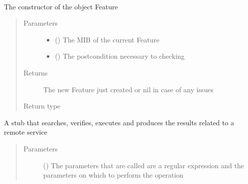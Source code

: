 \documentclass[a4paper,10pt,english,openany,oneside]{sphinxmanual}
\begin{document}
\begin{fulllineitems}
\label{\detokenize{code:Feature}}~

\begin{fulllineitems}
\label{\detokenize{code:Feature.new}}
The constructor of the object Feature
\begin{quote}\begin{description}
\item[{Parameters}] \leavevmode\begin{itemize}
\item {} 
 () \textendash{} The MIB of the current Feature

\item {} 
 () \textendash{} The post\sphinxhyphen{}condition necessary to checking

\end{itemize}

\item[{Returns}] \leavevmode
The new Feature just created or nil in case of any issues

\item[{Return type}] \leavevmode
{\hyperref[\detokenize{code:Feature}]{}}

\end{description}\end{quote}

\end{fulllineitems}


\begin{fulllineitems}
\label{\detokenize{code:Feature.call}}
A stub that searches, verifies, executes and produces the results related to a remote service
\begin{quote}\begin{description}
\item[{Parameters}] \leavevmode
{} () \textendash{} The parameters that are called are a regular expression and the parameters on which to perform the operation


\end{description}
\end{quote}
\end{fulllineitems}
\end{fulllineitems}
\end{document}
